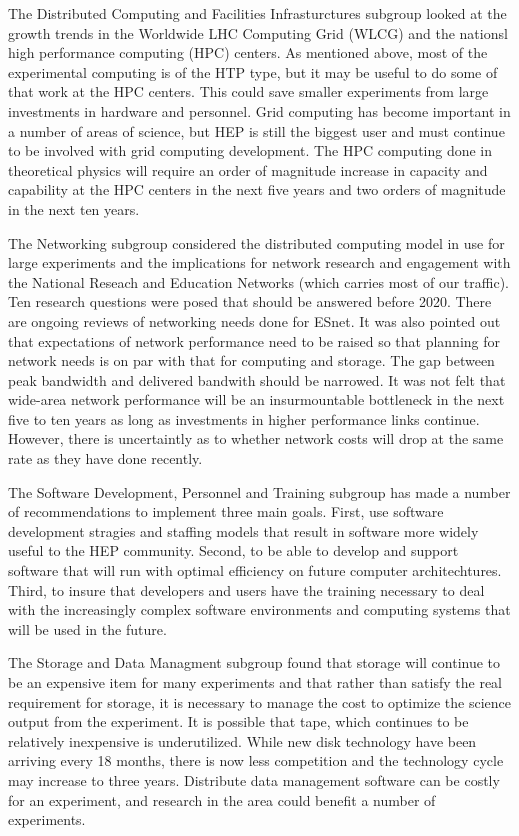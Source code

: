 The Distributed Computing and Facilities Infrasturctures
subgroup looked at the growth trends in the Worldwide LHC
Computing Grid (WLCG) and the nationsl high performance computing
(HPC) centers.  As mentioned above, most of the experimental computing
is of the HTP type, but it may be useful to do some of that work at
the HPC centers.  This could save smaller experiments from large
investments in hardware and personnel.  Grid computing has become
important in a number of areas of science, but HEP is still the
biggest user and must continue to be involved with grid computing
development.  The HPC computing done in theoretical physics will
require an order of magnitude increase in capacity and capability
at the HPC centers in the next five years and two orders of 
magnitude in the next ten years.

The Networking subgroup considered the distributed computing
model in use for large experiments and the implications for
network research and engagement with the National Reseach and
Education Networks (which carries most of our traffic).
Ten research questions were posed that should be answered before 2020.
There are ongoing reviews of networking needs done for ESnet.
It was also pointed out that expectations of network performance
need to be raised so that planning for network needs is on par with
that for computing and storage.  The gap between peak bandwidth and
delivered bandwith should be narrowed.  It was not felt that wide-area
network performance will be an insurmountable bottleneck in the
next five to ten years as long as investments in higher performance
links continue.  However, there is uncertaintly as to whether network
costs will drop at the same rate as they have done recently.

The Software Development, Personnel and Training subgroup has
made a number of recommendations to implement three main
goals.  First, use software development stragies and staffing models
that result in software more widely useful to the HEP
community.  Second, to be able to develop and support software
that will run with optimal efficiency on future computer architechtures.
Third, to insure that developers and users have the training
necessary to deal with the increasingly complex software environments
and computing systems that will be used in the future.

The Storage and Data Managment subgroup found that storage will
continue to be an expensive item for many experiments and that
rather than satisfy the real requirement for storage, it is
necessary to manage the cost to optimize the science output
from the experiment.  It is possible that tape, which continues
to be relatively inexpensive is underutilized.  While new disk
technology have been arriving every 18 months, there is now
less competition and the technology cycle may increase to three
years.  Distribute data management software can be costly for
an experiment, and research in the area could benefit a number
of experiments.

